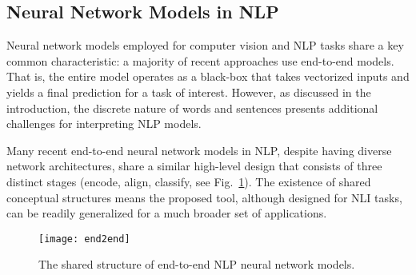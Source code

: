 

\subsection{Neural Network Models in NLP}
Neural network models employed for computer vision and NLP tasks share a key common characteristic: a majority of recent approaches use end-to-end models. That is, the entire model operates as a black-box that takes vectorized inputs and yields a final prediction for a task of interest.
However, as discussed in the introduction, the discrete nature of words and sentences presents additional challenges for
interpreting NLP models.
%

Many recent end-to-end neural network models in NLP, despite having  diverse network architectures, share a similar high-level design that consists of three distinct stages (encode, align, classify, see Fig.~\ref{fig:end2end}).
%
The existence of shared conceptual structures means the proposed tool, although designed for NLI tasks, can be readily generalized for a much broader set of applications.

\begin{figure}[htbp]
\centering
 \texttt{[image: end2end]}
 \vspace{-6mm}
 \caption{The shared structure of end-to-end NLP neural network models.}
  \vspace{-5mm}
\label{fig:end2end}
\end{figure}

